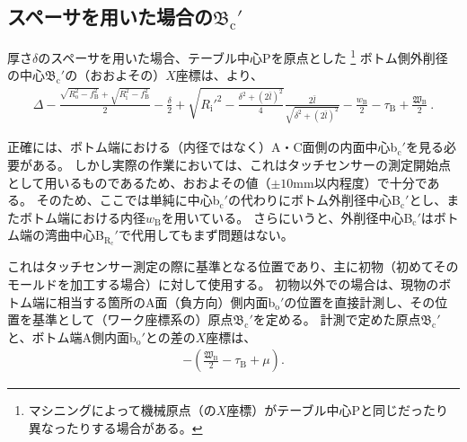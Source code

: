 \subsection[スペーサを用いた場合の\texorpdfstring{$\mathfrak B_\mathrm c'$}{Bc'}]
           {スペーサを用いた場合の$\boldsymbol{\mathfrak B_\mathrm c'}$}
厚さ$\delta$のスペーサを用いた場合、テーブル中心Pを原点とした
\footnote{マシニングによって機械原点（の$X$座標）がテーブル中心Pと同じだったり異なったりする場合がある。}\relax
ボトム側外削径の中心$\mathfrak B_\mathrm c'$の（おおよその）$X$座標は、より、
\begin{align*}
  \varDelta-\frac{\sqrt{R_\mathrm o^2-f_\mathrm B^2}+\sqrt{R_\mathrm i^2-f_\mathrm B^2}}2-\frac\delta2
  +\sqrt{R_\mathrm i'^2-\frac{\delta^2+(2\bar l)^2}4}\frac{2\bar l}{\sqrt{\delta^2+(2\bar l)^2}}
  -\frac{w_\mathrm B}2-\tau_\mathrm B+\frac{\mathfrak W_\mathrm B}2\ .
\end{align*}
\begin{hosoku}
正確には、ボトム端における（内径ではなく）A・C面側の内面中心b$_\mathrm c'$を見る必要がある。
しかし実際の作業においては、これはタッチセンサーの測定開始点として用いるものであるため、おおよその値（$\pm10$mm以内程度）で十分である。
そのため、ここでは単純に中心b$_\mathrm c'$の代わりにボトム外削径中心B$_\mathrm c'$とし、またボトム端における内径$w_\mathrm B$を用いている。
さらにいうと、外削径中心B$_\mathrm c'$はボトム端の湾曲中心B$_{\mathrm R_\mathrm c}'$で代用してもまず問題はない。
\end{hosoku}
これはタッチセンサー測定の際に基準となる位置であり、主に初物（初めてそのモールドを加工する場合）に対して使用する。
初物以外での場合は、現物のボトム端に相当する箇所のA面（負方向）側内面b$_\mathrm o'$の位置を直接計測し、その位置を基準として（ワーク座標系の）原点$\mathfrak B_\mathrm c'$を定める。
計測で定めた原点$\mathfrak B_\mathrm c'$と、ボトム端A側内面b$_\mathrm o'$との差の$X$座標は、
\begin{align*}
  -\left(\frac{\mathfrak W_\mathrm B}2-\tau_\mathrm B+\mu\right).
\end{align*}


